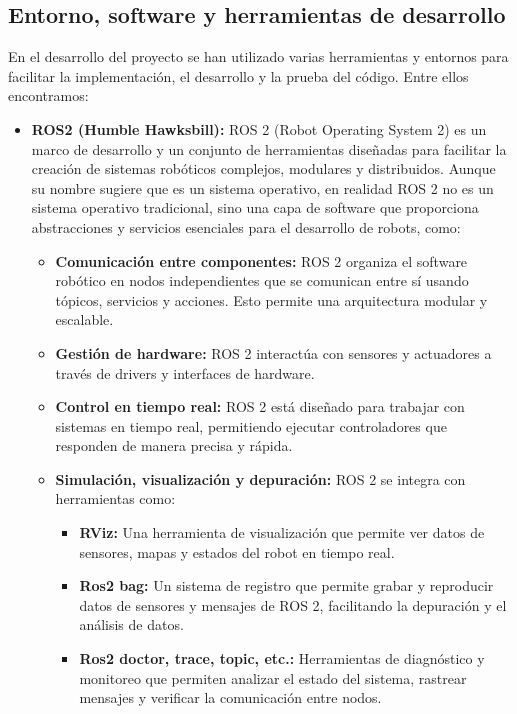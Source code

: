 \documentclass[12pt, a4paper, twoside]{article}
\begin{document}
\subsection{Entorno, software y herramientas de desarrollo}
  En el desarrollo del proyecto se han utilizado varias herramientas y entornos para facilitar la implementación, el desarrollo
  y la prueba del código. Entre ellos encontramos:
  \begin{itemize}
    \item
      \textbf{ROS2\cite{doi:10.1126/scirobotics.abm6074} (Humble Hawksbill):} ROS 2 (Robot Operating System 2) es un marco de desarrollo y un conjunto de herramientas 
      diseñadas para facilitar la creación de sistemas robóticos complejos, modulares y distribuidos. Aunque su nombre sugiere que es 
      un sistema operativo, en realidad ROS 2 no es un sistema operativo tradicional, sino una capa de software que proporciona 
      abstracciones y servicios esenciales para el desarrollo de robots, como:
      \begin{itemize}
        \item \textbf{Comunicación entre componentes:} ROS 2 organiza el software robótico en nodos independientes que se comunican 
        entre sí usando tópicos, servicios y acciones. Esto permite una arquitectura modular y escalable.
        \item \textbf{Gestión de hardware:} ROS 2 interactúa con sensores y actuadores a través de drivers y interfaces de hardware.
        \item \textbf{Control en tiempo real:} ROS 2 está diseñado para trabajar con sistemas en tiempo real, permitiendo ejecutar 
        controladores que responden de manera precisa y rápida. 
        \item \textbf{Simulación, visualización y depuración:} ROS 2 se integra con herramientas como:
        \begin{itemize}
        \item \textbf{RViz:} Una herramienta de visualización que permite ver datos de sensores, mapas y estados del robot en 
        tiempo real.
        \item \textbf{Ros2 bag:} Un sistema de registro que permite grabar y reproducir datos de sensores y mensajes de ROS 2, 
        facilitando la depuración y el análisis de datos.
        \item \textbf{Ros2 doctor, trace, topic, etc.:} Herramientas de diagnóstico y monitoreo que permiten analizar el estado 
        del sistema, rastrear mensajes y verificar la comunicación entre nodos.

\end{itemize}
\end{itemize}
\end{itemize}
\end{document}
